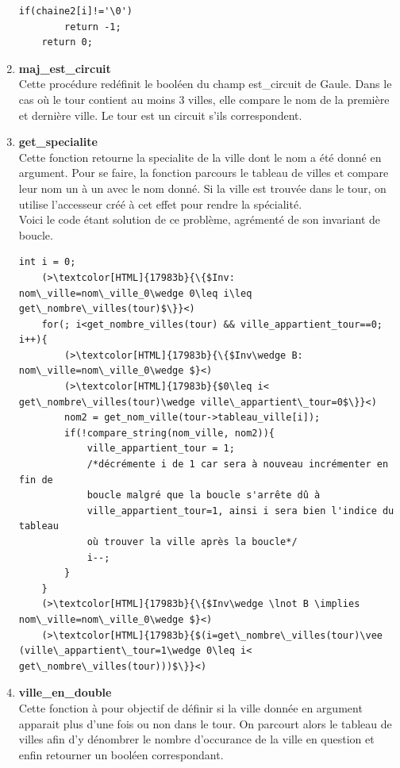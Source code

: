 \documentclass[a4paper, 11pt, oneside]{article}
\begin{document}
\begin{enumerate}
\begin{lstlisting}[caption = {code comparaison de 2 chaines de caractères}]
    if(chaine2[i]!='\0')
        return -1;
    return 0;
    \end{lstlisting}
    \item \textbf{maj\_est\_circuit}
    \\Cette procédure redéfinit le booléen du champ est\_circuit de Gaule. Dans le cas où le tour contient
    au moins 3 villes, elle compare le nom de la première et dernière ville. Le tour est un circuit s'ils 
    correspondent.
    \item \textbf{get\_specialite}
    \\Cette fonction retourne la specialite de la ville dont le nom a été donné en argument. Pour se faire, 
    la fonction parcours le tableau de villes et compare leur nom un à un avec le nom donné. Si la 
    ville est trouvée dans le tour, on utilise l'accesseur créé à cet effet pour rendre la spécialité.
    \\Voici le code étant solution de ce problème, agrémenté de son invariant de boucle.
    \begin{lstlisting}[caption = {code boucle trouver ville correspondante}]
    int i = 0;
    (>\textcolor[HTML]{17983b}{\{$Inv: nom\_ville=nom\_ville_0\wedge 0\leq i\leq get\_nombre\_villes(tour)$\}}<)
    for(; i<get_nombre_villes(tour) && ville_appartient_tour==0; i++){
        (>\textcolor[HTML]{17983b}{\{$Inv\wedge B: nom\_ville=nom\_ville_0\wedge $}<)
        (>\textcolor[HTML]{17983b}{$0\leq i< get\_nombre\_villes(tour)\wedge ville\_appartient\_tour=0$\}}<)
        nom2 = get_nom_ville(tour->tableau_ville[i]);
        if(!compare_string(nom_ville, nom2)){
            ville_appartient_tour = 1;
            /*décrémente i de 1 car sera à nouveau incrémenter en fin de 
            boucle malgré que la boucle s'arrête dû à 
            ville_appartient_tour=1, ainsi i sera bien l'indice du tableau 
            où trouver la ville après la boucle*/
            i--;
        }
    }    
    (>\textcolor[HTML]{17983b}{\{$Inv\wedge \lnot B \implies nom\_ville=nom\_ville_0\wedge $}<)
    (>\textcolor[HTML]{17983b}{$(i=get\_nombre\_villes(tour)\vee (ville\_appartient\_tour=1\wedge 0\leq i< get\_nombre\_villes(tour)))$\}}<)
    \end{lstlisting}
    \item \textbf{ville\_en\_double}
    \\Cette fonction à pour objectif de définir si la ville donnée en argument apparait plus d'une fois 
    ou non dans le tour. On parcourt alors le tableau de villes afin d'y dénombrer le nombre d'occurance
    de la ville en question et enfin retourner un booléen correspondant.

\end{enumerate}
\end{document}
